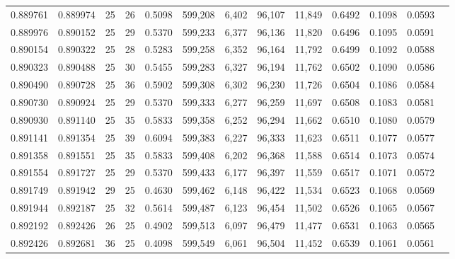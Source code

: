\begin{tabular}{rrrrrrrrrrrrr}
0.889761 & 0.889974 &    25 &  26 &                                     0.5098 & 599,208 &   6,402 &  96,107 &  11,849 & 0.6492 & 0.1098 & 0.0593 \\
0.889976 & 0.890152 &    25 &  29 &                                     0.5370 & 599,233 &   6,377 &  96,136 &  11,820 & 0.6496 & 0.1095 & 0.0591 \\
0.890154 & 0.890322 &    25 &  28 &                                     0.5283 & 599,258 &   6,352 &  96,164 &  11,792 & 0.6499 & 0.1092 & 0.0588 \\
0.890323 & 0.890488 &    25 &  30 &                                     0.5455 & 599,283 &   6,327 &  96,194 &  11,762 & 0.6502 & 0.1090 & 0.0586 \\
0.890490 & 0.890728 &    25 &  36 &                                     0.5902 & 599,308 &   6,302 &  96,230 &  11,726 & 0.6504 & 0.1086 & 0.0584 \\
0.890730 & 0.890924 &    25 &  29 &                                     0.5370 & 599,333 &   6,277 &  96,259 &  11,697 & 0.6508 & 0.1083 & 0.0581 \\
0.890930 & 0.891140 &    25 &  35 &                                     0.5833 & 599,358 &   6,252 &  96,294 &  11,662 & 0.6510 & 0.1080 & 0.0579 \\
0.891141 & 0.891354 &    25 &  39 &                                     0.6094 & 599,383 &   6,227 &  96,333 &  11,623 & 0.6511 & 0.1077 & 0.0577 \\
0.891358 & 0.891551 &    25 &  35 &                                     0.5833 & 599,408 &   6,202 &  96,368 &  11,588 & 0.6514 & 0.1073 & 0.0574 \\
0.891554 & 0.891727 &    25 &  29 &                                     0.5370 & 599,433 &   6,177 &  96,397 &  11,559 & 0.6517 & 0.1071 & 0.0572 \\
0.891749 & 0.891942 &    29 &  25 &                                     0.4630 & 599,462 &   6,148 &  96,422 &  11,534 & 0.6523 & 0.1068 & 0.0569 \\
0.891944 & 0.892187 &    25 &  32 &                                     0.5614 & 599,487 &   6,123 &  96,454 &  11,502 & 0.6526 & 0.1065 & 0.0567 \\
0.892192 & 0.892426 &    26 &  25 &                                     0.4902 & 599,513 &   6,097 &  96,479 &  11,477 & 0.6531 & 0.1063 & 0.0565 \\
0.892426 & 0.892681 &    36 &  25 &                                     0.4098 & 599,549 &   6,061 &  96,504 &  11,452 & 0.6539 & 0.1061 & 0.0561 \\

\end{tabular}
